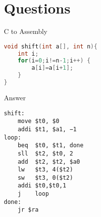 \section{Questions}
\begin{frame}[fragile]{C to Assembly}
\begin{lstlisting}[language=c, keywordstyle=\color{purple}\textbf]
void shift(int a[], int n){
    int i;
    for(i=0;i!=n-1;i++) {
        a[i]=a[i+1];
    }
}
\end{lstlisting}

\end{frame}

\begin{frame}[fragile]{Answer}
\begin{lstlisting}[keywordstyle=\color{purple}\textbf, keywords={move, addi, beq, sll, add, lw, sw, j, jr}]
shift:
    move $t0, $0
    addi $t1, $a1, −1
loop:
    beq  $t0, $t1, done
    sll  $t2, $t0, 2
    add  $t2, $t2, $a0
    lw   $t3, 4($t2)
    sw   $t3, 0($t2)
    addi $t0,$t0,1
    j    loop
done:
    jr $ra
\end{lstlisting}
\end{frame}